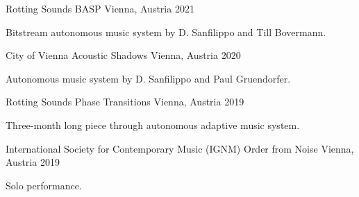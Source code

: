 

\begin{cventries}

  \cventry
    {Rotting Sounds} %
    {BASP} %
    {Vienna, Austria} %
    {2021} %
    { 
      \begin{cvitems} %
        \item {Bitstream autonomous music system by D. Sanfilippo and Till Bovermann.}
      \end{cvitems}
    }

  \cventry
    {City of Vienna} %
    {Acoustic Shadows} %
    {Vienna, Austria} %
    {2020} %
    {
      \begin{cvitems} %
        \item {Autonomous music system by D. Sanfilippo and Paul Gruendorfer.}
      \end{cvitems}
    }

  \cventry
    {Rotting Sounds} %
    {Phase Transitions} %
    {Vienna, Austria} %
    {2019} %
    {
      \begin{cvitems} %
        \item {Three-month long piece through autonomous adaptive music system.}
      \end{cvitems}
    }

  \cventry
    {International Society for Contemporary Music (IGNM)} %
    {Order from Noise} %
    {Vienna, Austria} %
    {2019} %
    {
      \begin{cvitems} %
        \item {Solo performance.}
      \end{cvitems}
    }


\end{cventries}
